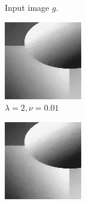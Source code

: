 \documentclass[abstracton]{scrreprt}
\begin{document}
\begin{figure}[!ht]
\begin{subfigure}[b]{0.22\textwidth}
                    \caption{Input image $g$.}
                \end{subfigure}
                \begin{subfigure}[b]{0.22\textwidth}
                    \includegraphics[width=\textwidth]{img/dykstra/synth_gauss.png}
                    \caption{$\lambda = 2, \nu = 0.01$}
                \end{subfigure}
                \begin{subfigure}[b]{0.22\textwidth}
                    \includegraphics[width=\textwidth]{img/lagrange/synth_gauss.png}

\end{subfigure}
\end{figure}
\end{document}
